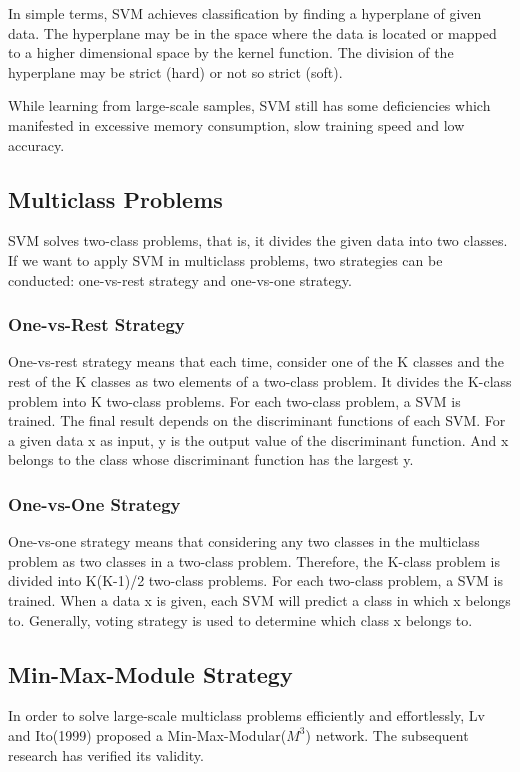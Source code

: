 In simple terms, SVM achieves classification by finding a hyperplane of given data. The hyperplane may be in the space where the data is located or mapped to a higher dimensional space by the kernel function. The division of the hyperplane may be strict (hard) or not so strict (soft).


While learning from large-scale samples, SVM still has some deficiencies which manifested in excessive memory consumption, slow training speed and low accuracy\cite{platt1999fast}.


\subsection{Multiclass Problems}
SVM solves two-class problems, that is, it divides the given data into two classes. If we want to apply SVM in multiclass problems, two strategies can be conducted: one-vs-rest strategy and one-vs-one strategy.

\subsubsection{One-vs-Rest Strategy}
One-vs-rest strategy means that each time, consider one of the K classes and the rest of the K classes as two elements of a two-class problem. It divides the K-class problem into K two-class problems. For each two-class problem, a SVM is trained. The final result depends on the discriminant functions of each SVM. For a given data x as input, y is the output value of the discriminant function. And x belongs to the class whose discriminant function has the largest y.

\subsubsection{One-vs-One Strategy}
One-vs-one strategy means that considering any two classes in the multiclass problem as two classes in a two-class problem. Therefore, the K-class problem is divided into K(K-1)/2 two-class problems. For each two-class problem, a SVM is trained.  When a data x is given, each SVM will predict a class in which x belongs to. Generally, voting strategy is used to determine which class x belongs to.

\subsection{Min-Max-Module Strategy}
In order to solve large-scale multiclass problems efficiently  and effortlessly, Lv and Ito(1999) proposed a Min-Max-Modular(\( M^3 \)) network. The subsequent research has verified its validity.

